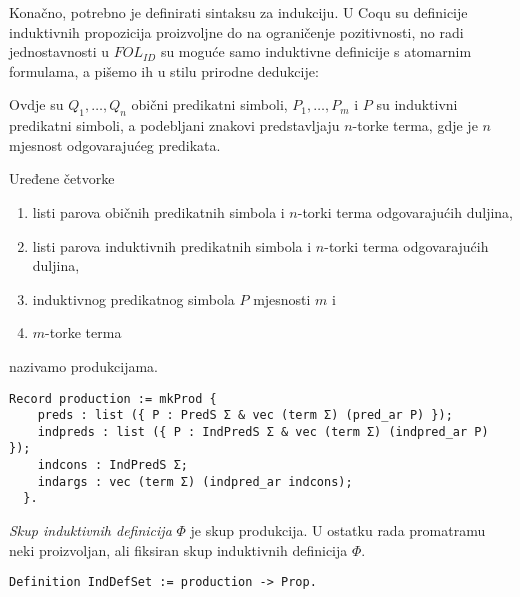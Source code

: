 Konačno, potrebno je definirati sintaksu za indukciju.
U Coqu su definicije induktivnih propozicija proizvoljne do na ograničenje pozitivnosti,
no radi jednostavnosti u \(\mathit{FOL_{ID}}\) su moguće samo
induktivne definicije s atomarnim formulama, a pišemo ih u stilu prirodne dedukcije:
\begin{prooftree}
\end{prooftree}
\noindent Ovdje su \(Q_{1}, \ldots, Q_{n}\) obični predikatni simboli, \(P_{1}, \ldots, P_{m}\) i \(P\) su induktivni predikatni simboli,
a podebljani znakovi predstavljaju \(n\)-torke terma, gdje je \(n\) mjesnost odgovarajućeg predikata.

\begin{definition}[Produkcija]
  Uređene četvorke
  \begin{enumerate}
  \item listi parova običnih predikatnih simbola i \(n\)-torki terma odgovarajućih duljina,
  \item listi parova induktivnih predikatnih simbola i \(n\)-torki terma odgovarajućih duljina,
  \item induktivnog predikatnog simbola \(P\) mjesnosti \(m\) i
  \item \(m\)-torke terma
  \end{enumerate}
  nazivamo produkcijama.
\begin{verbatim}
Record production := mkProd {
    preds : list ({ P : PredS Σ & vec (term Σ) (pred_ar P) });
    indpreds : list ({ P : IndPredS Σ & vec (term Σ) (indpred_ar P) });
    indcons : IndPredS Σ;
    indargs : vec (term Σ) (indpred_ar indcons);
  }.
\end{verbatim}
  \textit{Skup induktivnih definicija} \(\Phi\) je skup produkcija.
  U ostatku rada promatramu neki proizvoljan, ali fiksiran skup induktivnih definicija \(\Phi\).
\begin{verbatim}
Definition IndDefSet := production -> Prop.
\end{verbatim}
\end{definition}


